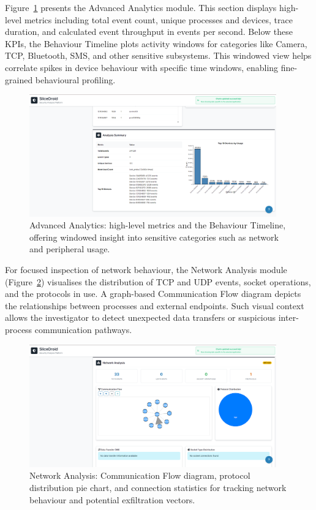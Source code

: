 \documentclass[a4paper,12pt]{report}
\begin{document}
Figure~\ref{fig:analytics_panel} presents the Advanced Analytics module. This section displays high-level metrics including total event count, unique processes and devices, trace duration, and calculated event throughput in events per second. Below these KPIs, the Behaviour Timeline plots activity windows for categories like Camera, TCP, Bluetooth, SMS, and other sensitive subsystems. This windowed view helps correlate spikes in device behaviour with specific time windows, enabling fine-grained behavioural profiling.

\begin{figure}[H]
\centering
\includegraphics[width=0.95\textwidth]{analytics_panel.png}
\caption{Advanced Analytics: high-level metrics and the Behaviour Timeline, offering windowed insight into sensitive categories such as network and peripheral usage.}
\label{fig:analytics_panel}
\end{figure}

For focused inspection of network behaviour, the Network Analysis module (Figure~\ref{fig:network_view}) visualises the distribution of TCP and UDP events, socket operations, and the protocols in use. A graph-based Communication Flow diagram depicts the relationships between processes and external endpoints. Such visual context allows the investigator to detect unexpected data transfers or suspicious inter-process communication pathways.

\begin{figure}[H]
\centering
\includegraphics[width=0.95\textwidth]{network_view.png}
\caption{Network Analysis: Communication Flow diagram, protocol distribution pie chart, and connection statistics for tracking network behaviour and potential exfiltration vectors.}
\label{fig:network_view}
\end{figure}
\end{document}
